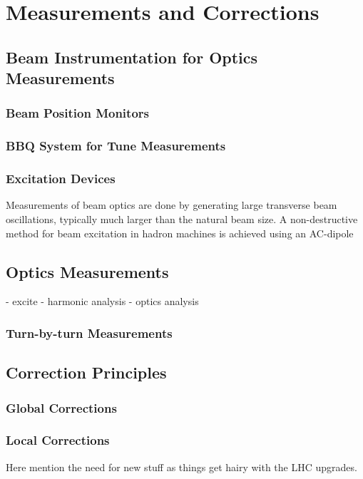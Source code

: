 
\section{Measurements and Corrections}


\subsection{Beam Instrumentation for Optics Measurements}

\subsubsection{Beam Position Monitors}


\subsubsection{BBQ System for Tune Measurements}

\subsubsection{Excitation Devices}


Measurements of beam optics are done by generating large transverse beam oscillations, typically much larger than the natural beam size.
A non-destructive method for beam excitation in hadron machines is achieved using an AC-dipole

\subsection{Optics Measurements}

- excite
- harmonic analysis
- optics analysis

\subsubsection{Turn-by-turn Measurements}

\subsection{Correction Principles}

\subsubsection{Global Corrections}

\subsubsection{Local Corrections}

Here mention the need for new stuff as things get hairy with the LHC upgrades.
